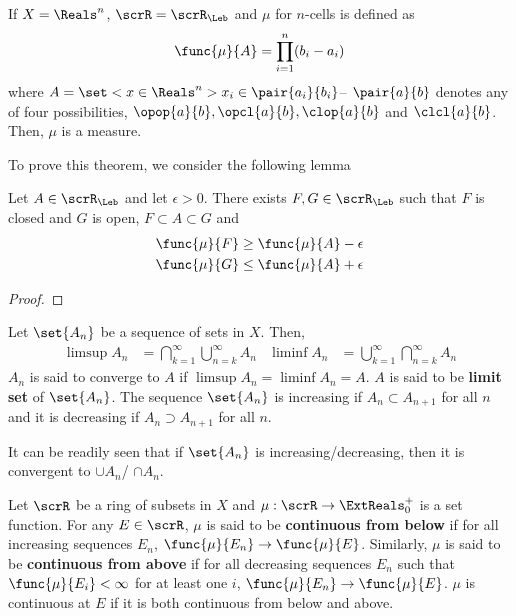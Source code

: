 \begin{theorem}
    If \(X = \Reals^n\), \(\scrR = \scrR_{\Leb}\) and \(\mu\) for \(n\)-cells is defined as
    \begin{equation*}
        \func{\mu}{A} = \prod_{i = 1}^n( b_i - a_i)
    \end{equation*}
    where \(A = \set<x \in \Reals^n>{x_i \in \pair{a_i}{b_i}}\)-- \(\pair{a}{b}\) denotes any of  four possibilities, \(\opop{a}{b}, \opcl{a}{b}, \clop{a}{b}\) and \(\clcl{a}{b}\). Then, \(\mu\) is a measure.
\end{theorem}
To prove this theorem, we consider the following lemma 
\begin{lemma}
    Let \(A \in \scrR_{\Leb}\) and let \(\epsilon > 0\). There exists \(F,G \in \scrR_{\Leb}\) such that \(F\) is closed and \(G\) is open, \(F \subset A \subset G\) and 
    \begin{align*}
        \func{\mu}{F} &\geq \func{\mu}{A} - \epsilon\\
        \func{\mu}{G} &\leq \func{\mu}{A} + \epsilon
    \end{align*}
\end{lemma}
\begin{prooflemma}
    
\end{prooflemma}

\begin{proof}
    
\end{proof}

\begin{definition}
Let \(\set{A_n}\) be a sequence of sets in \(X\). Then, 
    \begin{align*}
        \limsup A_n &= \bigcap_{k = 1}^{\infty} \bigcup_{n = k}^{\infty} A_n & \liminf A_n &= \bigcup_{k = 1}^{\infty} \bigcap_{n = k}^{\infty} A_n
    \end{align*}
    \(A_n\) is said to converge to \(A\) if \(\limsup A_n = \liminf A_n = A\). \(A\) is said to be \textbf{limit set} of \(\set{A_n}\). The sequence \(\set{A_n}\) is increasing if \(A_{n} \subset A_{n+1}\) for all \(n\) and it is decreasing if \(A_n \supset A_{n+1}\) for all \(n\).
\end{definition}

It can be readily seen that if \(\set{A_n}\) is increasing/decreasing, then it is convergent to \(\cup A_n\)/ \(\cap A_n\).

\begin{definition}
    Let \(\scrR\) be a ring of subsets in \(X\) and \(\mu:\scrR \to \ExtReals^+_0\) is a set function. For any \(E \in \scrR\), \(\mu\) is said to be \textbf{continuous from below} if for all increasing sequences \(E_n\), \(\func{\mu}{E_n} \to \func{\mu}{E}\). Similarly, \(\mu\) is said to be \textbf{continuous from above} if for all decreasing sequences \(E_n\) such that \(\func{\mu}{E_i} < \infty\) for at least one \(i\), \(\func{\mu}{E_n} \to \func{\mu}{E}\). \(\mu\) is continuous at \(E\) if it is both continuous from below and  above.
\end{definition}

